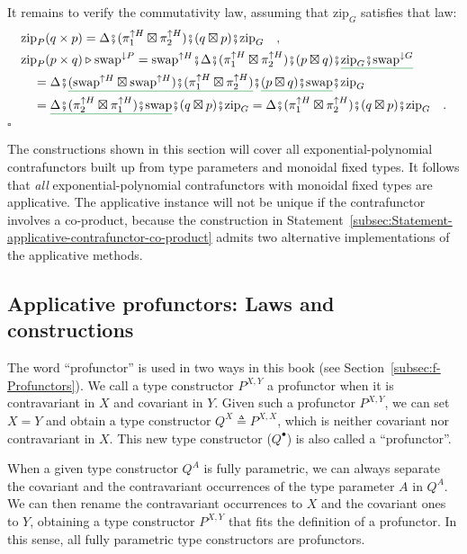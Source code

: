 It remains to verify the commutativity law, assuming that $\text{zip}_{G}$
satisfies that law:
\begin{align*}
 & \text{zip}_{P}(q\times p)=\Delta\bef(\pi_{1}^{\uparrow H}\boxtimes\pi_{2}^{\uparrow H})\bef(q\boxtimes p)\bef\text{zip}_{G}\quad,\\
 & \text{zip}_{P}(p\times q)\triangleright\text{swap}^{\downarrow P}=\text{swap}^{\uparrow H}\bef\Delta\bef(\pi_{1}^{\uparrow H}\boxtimes\pi_{2}^{\uparrow H})\bef(p\boxtimes q)\bef\gunderline{\text{zip}_{G}\bef\text{swap}^{\downarrow G}}\\
 & \quad=\Delta\bef\gunderline{(\text{swap}^{\uparrow H}\boxtimes\text{swap}^{\uparrow H})\bef(\pi_{1}^{\uparrow H}\boxtimes\pi_{2}^{\uparrow H})}\bef\gunderline{(p\boxtimes q)\bef\text{swap}}\bef\text{zip}_{G}\\
 & \quad=\gunderline{\Delta\bef(\pi_{2}^{\uparrow H}\boxtimes\pi_{1}^{\uparrow H})\bef\text{swap}}\bef(q\boxtimes p)\bef\text{zip}_{G}=\Delta\bef(\pi_{1}^{\uparrow H}\boxtimes\pi_{2}^{\uparrow H})\bef(q\boxtimes p)\bef\text{zip}_{G}\quad.
\end{align*}
$\square$

The constructions shown in this section will cover all exponential-polynomial
contrafunctors built up from type parameters and monoidal fixed types.
It follows that \emph{all} exponential-polynomial contrafunctors with
monoidal fixed types are applicative. The applicative instance will
not be unique if the contrafunctor involves a co-product, because
the construction in Statement~\ref{subsec:Statement-applicative-contrafunctor-co-product}
admits two alternative implementations of the applicative methods.

\subsection{Applicative profunctors: Laws and constructions}

The word \textsf{``}profunctor\textsf{''} is used in two ways in
this book (see Section~\ref{subsec:f-Profunctors}). We call a type
constructor $P^{X,Y}$ a profunctor when it is contravariant in $X$
and covariant in $Y$. Given such a profunctor $P^{X,Y}$, we can
set $X=Y$ and obtain a type constructor $Q^{X}\triangleq P^{X,X}$,
which is neither covariant nor contravariant in $X$. This new type
constructor ($Q^{\bullet}$) is also called a \textsf{``}profunctor\textsf{''}. 

When a given type constructor $Q^{A}$ is fully parametric, we can
always separate the covariant and the contravariant occurrences of
the type parameter $A$ in $Q^{A}$. We can then rename the contravariant
occurrences to $X$ and the covariant ones to $Y$, obtaining a type
constructor $P^{X,Y}$ that fits the definition of a profunctor. In
this sense, all fully parametric type constructors are profunctors.

